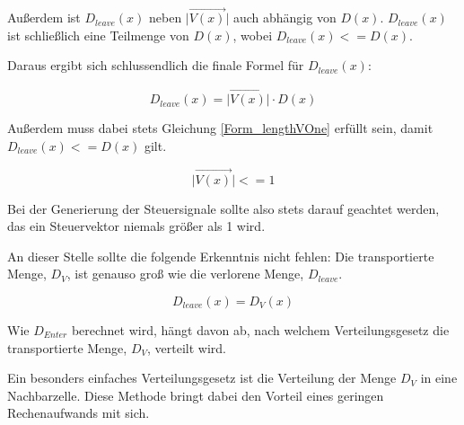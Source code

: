 \documentclass[a4paper, 10pt, journal]{wissarbIEEE}      %
\newcommand{\length}[1]{\lvert \vec{#1} \rvert}
\begin{document}
Außerdem ist $D_{leave}(x)$ neben $\length{V(x)}$ auch abhängig von $D(x)$. $D_{leave}(x)$ ist schließlich eine Teilmenge von $D(x)$, wobei $D_{leave}(x) <= D(x)$.

Daraus ergibt sich schlussendlich die finale Formel für $D_{leave}(x)$:

\begin{equation}
D_{leave}(x) = \length{V(x)} \cdot D(x)
\label{Form_DLeaveFinal}
\end{equation}

Außerdem muss dabei stets Gleichung \ref{Form_lengthVOne} erfüllt sein, damit $D_{leave}(x) <= D(x)$ gilt.

\begin{equation}
\length{V(x)} <= 1
\label{Form_lengthVOne}
\end{equation}

Bei der Generierung der Steuersignale sollte also stets darauf geachtet werden, das ein Steuervektor niemals größer als 1 wird.

An dieser Stelle sollte die folgende Erkenntnis nicht fehlen: Die transportierte Menge, $D_V$, ist genauso groß wie die verlorene Menge, $D_{leave}$.

\begin{equation}
D_{leave}(x) = D_V(x)
\label{Form_DLeaveEqDV}
\end{equation}



Wie $D_{Enter}$ berechnet wird, hängt davon ab, nach welchem Verteilungsgesetz die transportierte Menge, $D_V$, verteilt wird. 




Ein besonders einfaches Verteilungsgesetz ist die Verteilung der Menge $D_V$ in eine Nachbarzelle. Diese Methode bringt dabei den Vorteil eines geringen Rechenaufwands mit sich.
\end{document}
